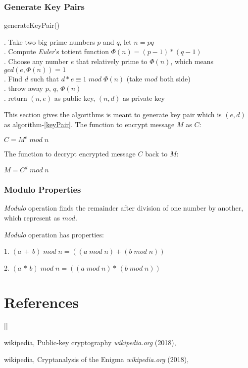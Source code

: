 \documentclass[twoside]{article}
\def\beginrefs{\begin{list}%
        {[\arabic{equation}]}{\usecounter{equation}
         \setlength{\leftmargin}{2.0truecm}\setlength{\labelsep}{0.4truecm}%
         \setlength{\labelwidth}{1.6truecm}}}
\def\endrefs{\end{list}}
\def\bibentry#1{\item[\hbox{[#1]}]}
\begin{document}
\subsubsection{Generate Key Pairs}

\begin{algorithm}[H]
    \caption{generateKeyPair()}
\begin{algorithmic}

    . Take two big prime numbers $p$ and $q$, let $n=pq$
    \\
    . Compute \textit{Euler}'s totient function $\Phi(n)=(p - 1)\ast(q - 1)$
    \\
    . Choose any number $e$ that relatively prime to $\Phi(n)$, which means
    $gcd(e, \Phi(n)) = 1$
    \\
    . Find $d$ such that $d\ast e \equiv 1\; mod\; \Phi(n)$ (take $mod$ both side)
    \\
    . throw away $p$, $q$, $\Phi(n)$
    \\
    . return $(n, e)$ as public key, $(n, d)$ as private key
\end{algorithmic}
    \label{keyPair}
\end{algorithm}
This section gives the algorithms is meant to generate key pair which is $(e, d)$ as algorithm-\ref{keyPair}.
The function to encrypt message $M$ as $C$:

$C = M^e\; mod\; n$

The function to decrypt encrypted message $C$ back to $M$:

$M = C^d\; mod\; n$

\subsubsection{Modulo Properties}

\textit{Modulo} operation finds the remainder after division of one number by another,
which represent as $mod$.

\textit{Modulo} operation has properties:

1. $(a\, +\, b)\; mod\; n = ((a\; mod\; n) + (b\; mod\; n))$

2. $(a\, \ast\, b)\; mod\; n = ((a\; mod\; n) \ast\, (b\; mod\; n))$


\clearpage
\section*{References}
\beginrefs
\bibentry{WikiRSA}{\sc wikipedia},
Public-key cryptography
{\it wikipedia.org} (2018),

\bibentry{WikiEnigma}{\sc wikipedia},
Cryptanalysis of the Enigma
{\it wikipedia.org} (2018),

\endrefs
\end{document}
